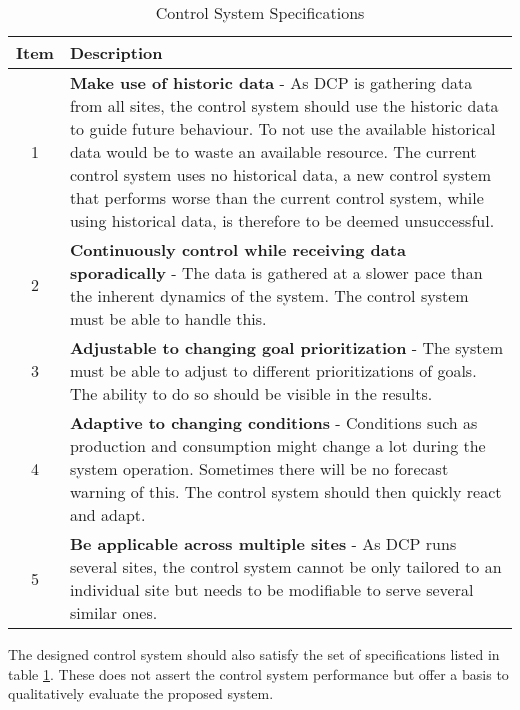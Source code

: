 \begin{table}[ht]
    \centering
    \begin{tabular}{|c|p{12cm}|}
        \hline
        \textbf{Item} & \textbf{Description} \\
        \hline
        1 & \textbf{Make use of historic data} - As DCP is gathering data from all sites, the control system should use the historic data to guide future behaviour. To not use the available historical data would be to waste an available resource.  The current control system uses no historical data, a new control system that performs worse than the current control system, while using historical data, is therefore to be deemed unsuccessful. \\
        \hline
        2 & \textbf{Continuously control while receiving data sporadically} - The data is gathered at a slower pace than the inherent dynamics of the system. The control system must be able to handle this. \\
        \hline
        3 & \textbf{Adjustable to changing goal prioritization} - The system must be able to adjust to different prioritizations of goals. The ability to do so should be visible in the results. \\
        \hline
        4 & \textbf{Adaptive to changing conditions} - Conditions such as production and consumption might change a lot during the system operation. Sometimes there will be no forecast warning of this. The control system should then quickly react and adapt. \\
        \hline
        5 & \textbf{Be applicable across multiple sites} - As DCP runs several sites, the control system cannot be only tailored to an individual site but needs to be modifiable to serve several similar ones. \\
        \hline
    \end{tabular}
    \caption{Control System Specifications}
    \label{tab:control_system_specification}
\end{table}

The designed control system should also satisfy the set of specifications listed in table \ref{tab:control_system_specification}. These does not assert the control system performance but offer a basis to qualitatively evaluate the proposed system.\\

